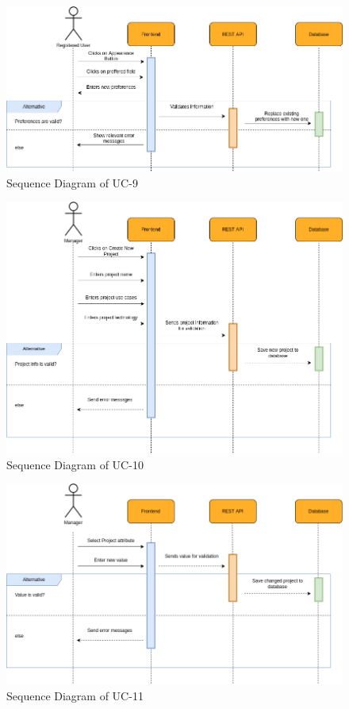 \begin{figure}[H]
    \centering
    \includegraphics[scale=0.5]{./diagrams/sequence/seq-09.png}
    \caption{Sequence Diagram of UC-9}
    \label{fig:seq-09}
    
\end{figure}


\begin{figure}[H]
    \centering
    \includegraphics[scale=0.5]{./diagrams/sequence/seq-10.png}
    \caption{Sequence Diagram of UC-10}
    \label{fig:seq-10}
    
\end{figure}


\begin{figure}[H]
    \centering
    \includegraphics[scale=0.5]{./diagrams/sequence/seq-11.png}
    \caption{Sequence Diagram of UC-11}
    \label{fig:seq-11}
    
\end{figure}


